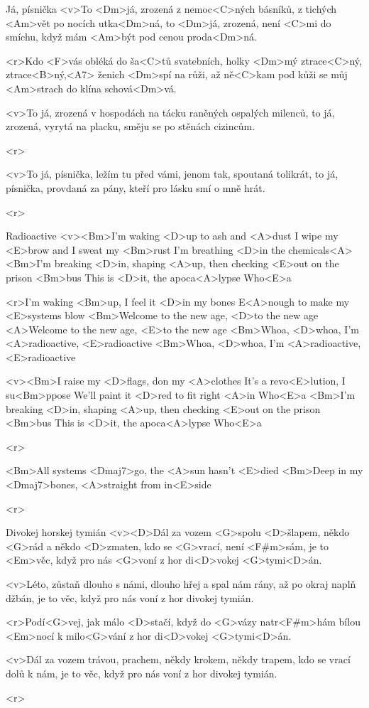 \begin{song}{71}{Já, písnička}{}
	<v>To <Dm>já, zrozená z nemoc<C>ných básníků,
	z tichých <Am>vět po nocích utka<Dm>ná,
	to <Dm>já, zrozená, není <C>mi do smíchu,
	když mám <Am>být pod cenou proda<Dm>ná.

	<r>Kdo <F>vás obléká do ša<C>tů svatebních,
	holky <Dm>mý ztrace<C>ný, ztrace<B>ný,<A7>
	ženich <Dm>spí na růži, až ně<C>kam pod kůži
	se můj <Am>strach do klína schová<Dm>vá.

	<v>To já, zrozená v hospodách na tácku
	raněných ospalých milenců,
	to já, zrozená, vyrytá na placku,
	směju se po stěnách cizincům.

	<r>

	<v>To já, písnička, ležím tu před vámi,
	jenom tak, spoutaná tolikrát,
	to já, písnička, provdaná za pány,
	kteří pro lásku smí o mně hrát.

	<r>
\end{song}

\begin{song}{74}{Radioactive}{}
	<v><Bm>I'm waking <D>up to ash and <A>dust
	I wipe my <E>brow and I sweat my <Bm>rust
	I'm breathing <D>in the chemicals<A>
	<Bm>I'm breaking <D>in, shaping <A>up, then checking <E>out on the prison <Bm>bus
	This is <D>it, the apoca<A>lypse
	Who<E>a

	<r>I'm waking <Bm>up, I feel it <D>in my bones
	E<A>nough to make my <E>systems blow
	<Bm>Welcome to the new age, <D>to the new age
	<A>Welcome to the new age, <E>to the new age
	<Bm>Whoa, <D>whoa, I'm <A>radioactive, <E>radioactive
	<Bm>Whoa, <D>whoa, I'm <A>radioactive, <E>radioactive

	<v><Bm>I raise my <D>flags, don my <A>clothes
	It's a revo<E>lution, I su<Bm>ppose
	We'll paint it <D>red to fit right <A>in
	Who<E>a
	<Bm>I'm breaking <D>in, shaping <A>up, then checking <E>out on the prison <Bm>bus
	This is <D>it, the apoca<A>lypse
	Who<E>a

	<r>

	<Bm>All systems <Dmaj7>go, the <A>sun hasn't <E>died
	<Bm>Deep in my <Dmaj7>bones, <A>straight from in<E>side

	<r>
\end{song}

\begin{song}{75}{Divokej horskej tymián}{}
	<v><D>Dál za vozem <G>spolu <D>šlapem,
	někdo <G>rád a někdo <D>zmaten,
	kdo se <G>vrací, není <F#m>sám,
	je to <Em>věc, když pro nás <G>voní
	z hor di<D>vokej <G>tymi<D>án.

	<v>Léto, zůstaň dlouho s námi,
	dlouho hřej a spal nám rány,
	až po okraj naplň džbán,
	je to věc, když pro nás voní
	z hor divokej tymián.

	<r>Podí<G>vej, jak málo <D>stačí, když do <G>vázy natr<F#m>hám
	bílou <Em>nocí k milo<G>vání z hor di<D>vokej <G>tymi<D>án.

	<v>Dál za vozem trávou, prachem,
	někdy krokem, někdy trapem,
	kdo se vrací dolů k nám,
	je to věc, když pro nás voní
	z hor divokej tymián.

	<r>
\end{song}

